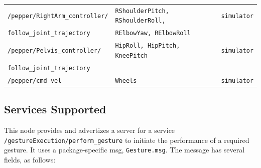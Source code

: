 \documentclass{CSSRforAfrica}
\begin{document}
\begin{longtable}[c]{|l|l|l|}
    \footnotesize{\texttt{/pepper/RightArm\_controller/}} & \footnotesize{\texttt{RShoulderPitch, RShoulderRoll,}} & \footnotesize{\texttt{simulator}} \\ 
\footnotesize{\texttt{follow\_joint\_trajectory}} & \footnotesize{\texttt{RElbowYaw, RElbowRoll}} & \footnotesize{} \\ \hline

    \footnotesize{\texttt{/pepper/Pelvis\_controller/}} & \footnotesize{\texttt{HipRoll, HipPitch, KneePitch}} & \footnotesize{\texttt{simulator}} \\ 
\footnotesize{\texttt{follow\_joint\_trajectory}} & \footnotesize{} & \footnotesize{} \\ \hline

    \footnotesize{\texttt{/pepper/cmd\_vel}} & \footnotesize{\texttt{Wheels}} & \footnotesize{\texttt{simulator}} \\ \hline
\end{longtable}
%

\newpage

\subsection*{Services Supported}
This node provides and advertizes a server for a service \texttt{/gestureExecution/perform\_gesture} to initiate the performance of a required gesture. It uses a package-specific msg, \texttt{Gesture.msg}. The message has several fields, as follows:
\end{document}
